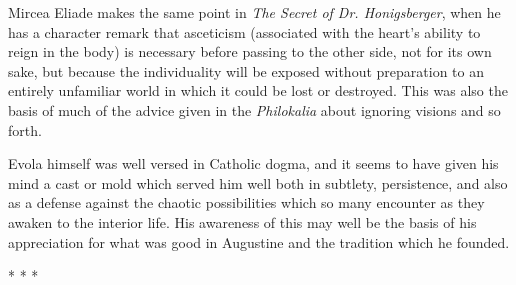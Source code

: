 Mircea Eliade makes the same point in \emph{The Secret of Dr. Honigsberger}, when he has a character remark that asceticism (associated with the heart's ability to reign in the body) is necessary before passing to the other side, not for its own sake, but because the individuality will be exposed without preparation to an entirely unfamiliar world in which it could be lost or destroyed. This was also the basis of much of the advice given in the \emph{Philokalia} about ignoring visions and so forth.

Evola himself was well versed in Catholic dogma, and it seems to have given his mind a cast or mold which served him well both in subtlety, persistence, and also as a defense against the chaotic possibilities which so many encounter as they awaken to the interior life. His awareness of this may well be the basis of his appreciation for what was good in Augustine and the tradition which he founded.



\begin{center}* * *\end{center}

